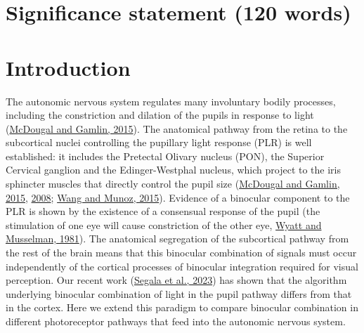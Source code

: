 \documentclass[
]{article}
\begin{document}
\hypertarget{significance-statement-120-words}{%
\section{Significance statement (120 words)}\label{significance-statement-120-words}}

\hypertarget{introduction}{%
\section{Introduction}\label{introduction}}

The autonomic nervous system regulates many involuntary bodily processes, including the constriction and dilation of the pupils in response to light (\protect\hyperlink{ref-McDougal2015}{McDougal and Gamlin, 2015}). The anatomical pathway from the retina to the subcortical nuclei controlling the pupillary light response (PLR) is well established: it includes the Pretectal Olivary nucleus (PON), the Superior Cervical ganglion and the Edinger-Westphal nucleus, which project to the iris sphincter muscles that directly control the pupil size (\protect\hyperlink{ref-McDougal2015}{McDougal and Gamlin, 2015}, \protect\hyperlink{ref-McDougal2008}{2008}; \protect\hyperlink{ref-Wang2015}{Wang and Munoz, 2015}). Evidence of a binocular component to the PLR is shown by the existence of a consensual response of the pupil (the stimulation of one eye will cause constriction of the other eye, \protect\hyperlink{ref-Wyatt1981}{Wyatt and Musselman, 1981}). The anatomical segregation of the subcortical pathway from the rest of the brain means that this binocular combination of signals must occur independently of the cortical processes of binocular integration required for visual perception. Our recent work (\protect\hyperlink{ref-Segala2023}{Segala et al., 2023}) has shown that the algorithm underlying binocular combination of light in the pupil pathway differs from that in the cortex. Here we extend this paradigm to compare binocular combination in different photoreceptor pathways that feed into the autonomic nervous system.
\end{document}

